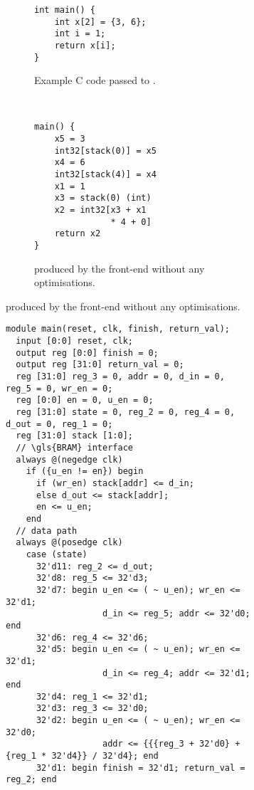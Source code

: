 \begin{figure}
  \centering
  \begin{subfigure}[b]{0.3\linewidth}
    \begin{subfigure}[t]{1\linewidth}
\begin{verbatim}
int main() {
    int x[2] = {3, 6};
    int i = 1;
    return x[i];
}
\end{verbatim}
      \caption{Example C code passed to \vericert{}.}\label{fig:accumulator_c}
    \end{subfigure}\\\vspace{3em}
    \begin{subfigure}[b]{1\linewidth}
\begin{verbatim}
main() {
    x5 = 3
    int32[stack(0)] = x5
    x4 = 6
    int32[stack(4)] = x4
    x1 = 1
    x3 = stack(0) (int)
    x2 = int32[x3 + x1
               * 4 + 0]
    return x2
}
\end{verbatim}
      \caption{\rtl{} produced by the \compcert{} front-end without any optimisations.}\label{fig:accumulator_rtl}
    \end{subfigure}
  \end{subfigure}\hfill%
  \begin{subfigure}[b]{0.65\linewidth}
\begin{verbatim}
module main(reset, clk, finish, return_val);
  input [0:0] reset, clk;
  output reg [0:0] finish = 0;
  output reg [31:0] return_val = 0;
  reg [31:0] reg_3 = 0, addr = 0, d_in = 0, reg_5 = 0, wr_en = 0;
  reg [0:0] en = 0, u_en = 0;
  reg [31:0] state = 0, reg_2 = 0, reg_4 = 0, d_out = 0, reg_1 = 0;
  reg [31:0] stack [1:0];
  // \gls{BRAM} interface
  always @(negedge clk)
    if ({u_en != en}) begin
      if (wr_en) stack[addr] <= d_in;
      else d_out <= stack[addr];
      en <= u_en;
    end
  // data path
  always @(posedge clk)
    case (state)
      32'd11: reg_2 <= d_out;
      32'd8: reg_5 <= 32'd3;
      32'd7: begin u_en <= ( ~ u_en); wr_en <= 32'd1;
                   d_in <= reg_5; addr <= 32'd0; end
      32'd6: reg_4 <= 32'd6;
      32'd5: begin u_en <= ( ~ u_en); wr_en <= 32'd1;
                   d_in <= reg_4; addr <= 32'd1; end
      32'd4: reg_1 <= 32'd1;
      32'd3: reg_3 <= 32'd0;
      32'd2: begin u_en <= ( ~ u_en); wr_en <= 32'd0;
                   addr <= {{{reg_3 + 32'd0} + {reg_1 * 32'd4}} / 32'd4}; end
      32'd1: begin finish = 32'd1; return_val = reg_2; end

\end{verbatim}
\end{subfigure}
\end{figure}
